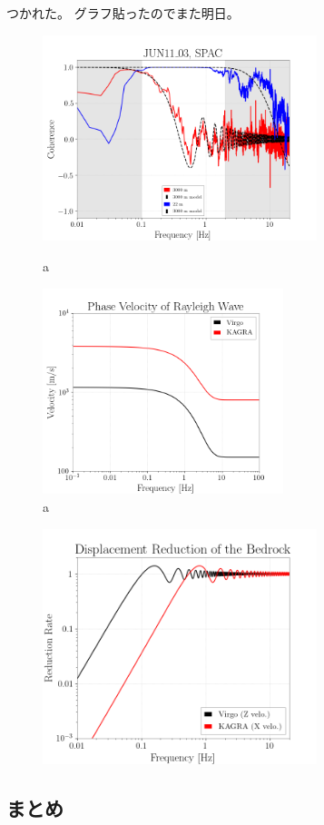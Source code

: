 \documentclass[a4paper,12pt]{jsarticle}
\begin{document}
つかれた。
グラフ貼ったのでまた明日。

\begin{figure}[H]
 \begin{minipage}{0.5\hsize}
  \begin{center}
    \includegraphics[width=8.0cm]{./img_coherence_result.png}    
  \end{center}
  \caption{a}
  \label{img:img_coherence_result}  
 \end{minipage}
 \begin{minipage}{0.5\hsize}
  \begin{center}
    \includegraphics[width=7.0cm]{./img_RwaveVelocity.png}    
  \end{center}
  \caption{a}
  \label{img:img_RwaveVelocity}  
 \end{minipage}
\end{figure}

\begin{figure}[H]
  \begin{center}
    \includegraphics[width=8.0cm]{./img_DMRR.png}
  \end{center}
  \caption{}
  \label{img:img_dmrr}
\end{figure}


\subsection{まとめ}

\appendix


\end{document}
